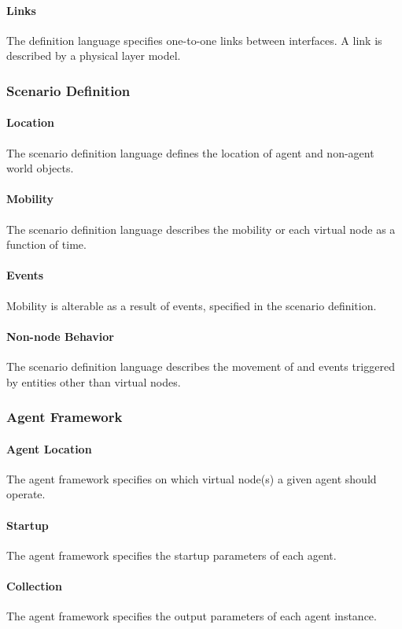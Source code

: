 \documentclass[titlepage]{article}
\begin{document}
	\paragraph{Links} The definition language specifies one-to-one links between interfaces.  A link is	described by a physical layer model.

\subsubsection{Scenario Definition}
	\paragraph{Location} The scenario definition language defines the location of agent and non-agent world objects.
	\paragraph{Mobility} The scenario definition language describes the mobility or each virtual node as a function of time.
	\paragraph{Events} Mobility is alterable as a result of events, specified in the scenario definition.
	\paragraph{Non-node Behavior} The scenario definition language describes the movement of and events triggered by entities other than virtual nodes.

\subsubsection{Agent Framework}
	\paragraph{Agent Location} The agent framework specifies on which virtual node(s) a given agent should operate.
	\paragraph{Startup} The agent framework specifies the startup parameters of each agent.
	\paragraph{Collection} The agent framework specifies the output parameters of each agent instance.
\end{document}
